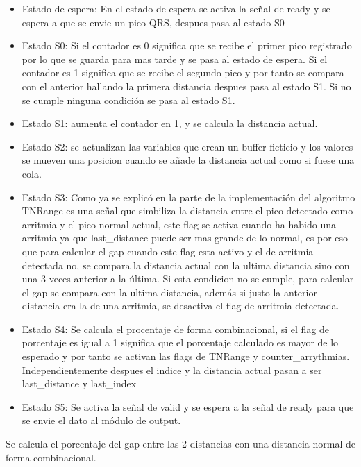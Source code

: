 \begin{itemize}
    \item Estado de espera: En el estado de espera se activa la señal de ready y se espera a que se envie un pico QRS, despues pasa al estado S0
    \item Estado S0: Si el contador es 0 significa que se recibe el primer pico registrado por lo que se guarda para mas tarde y se pasa al estado de espera.
    Si el contador es 1 significa que se recibe el segundo pico y por tanto se compara con el anterior hallando la primera distancia despues pasa al estado S1.
    Si no se cumple ninguna condición se pasa al estado S1.    
    \item Estado S1: aumenta el contador en 1, y se calcula la distancia actual.
    \item Estado S2: se actualizan las variables que crean un buffer ficticio y los valores se mueven una posicion cuando se añade la distancia actual como si fuese una cola.
    \item Estado S3: Como ya se explicó en la parte de la implementación del algoritmo TNRange es una señal que simbiliza la distancia entre el pico detectado como arritmia y 
    el pico normal actual, este flag se activa cuando ha habido una arritmia ya que last\_distance puede ser mas grande de lo normal, es por eso que para calcular el gap cuando este flag esta activo
     y el de arritmia detectada no, se compara la distancia actual con la ultima distancia sino con una 3 veces anterior a la última. Si esta condicion no se cumple, para calcular el gap se compara 
     con la ultima distancia, además si justo la anterior distancia era la de una arritmia, se desactiva el flag de arritmia detectada.
    \item Estado S4: Se calcula el procentaje de forma combinacional, si el flag de porcentaje es igual a 1 significa que el porcentaje calculado es mayor de lo esperado y por tanto se activan las flags
    de TNRange y counter\_arrythmias. Independientemente despues el indice y la distancia actual pasan a ser last\_distance y last\_index
    \item Estado S5: Se activa la señal de valid y se espera a la señal de ready para que se envie el dato al módulo de output.
\end{itemize}

Se calcula el porcentaje del gap entre las 2 distancias con una distancia normal de forma combinacional.

